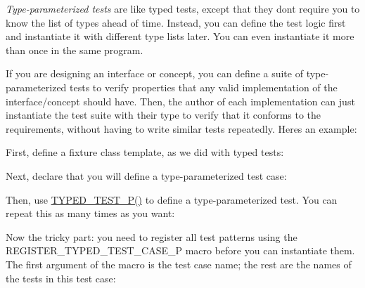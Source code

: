 {\itshape Type-\/parameterized tests} are like typed tests, except that they don\textquotesingle{}t require you to know the list of types ahead of time. Instead, you can define the test logic first and instantiate it with different type lists later. You can even instantiate it more than once in the same program.

If you are designing an interface or concept, you can define a suite of type-\/parameterized tests to verify properties that any valid implementation of the interface/concept should have. Then, the author of each implementation can just instantiate the test suite with their type to verify that it conforms to the requirements, without having to write similar tests repeatedly. Here\textquotesingle{}s an example\+:

First, define a fixture class template, as we did with typed tests\+:


\begin{DoxyCode}{0}
\DoxyCodeLine{\};}
\end{DoxyCode}


Next, declare that you will define a type-\/parameterized test case\+:


\begin{DoxyCode}{0}
\end{DoxyCode}


Then, use {\ttfamily \mbox{\hyperlink{googletest-list-tests-unittest___8cc_aadd51dfff9d63b5e0faa0130697684c1}{T\+Y\+P\+E\+D\+\_\+\+T\+E\+S\+T\+\_\+\+P()}}} to define a type-\/parameterized test. You can repeat this as many times as you want\+:


\begin{DoxyCode}{0}
\DoxyCodeLine{\}}
\DoxyCodeLine{}
\end{DoxyCode}


Now the tricky part\+: you need to register all test patterns using the {\ttfamily R\+E\+G\+I\+S\+T\+E\+R\+\_\+\+T\+Y\+P\+E\+D\+\_\+\+T\+E\+S\+T\+\_\+\+C\+A\+S\+E\+\_\+P} macro before you can instantiate them. The first argument of the macro is the test case name; the rest are the names of the tests in this test case\+:


